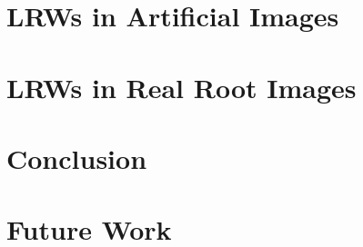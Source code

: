\documentclass{uofsthesis-cs}
\begin{document}
\chapter{LRWs in Artificial Images}

  

  

  
  
  
  
  
  



  
  
\chapter{LRWs in Real Root Images}

 

\chapter{Conclusion}
  


  
\chapter{Future Work}

 







  \uofsappendix %
\end{document}
